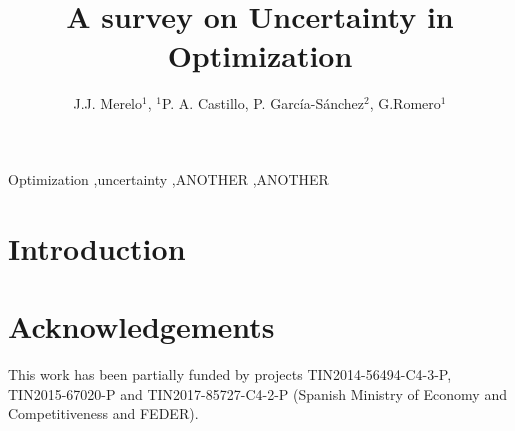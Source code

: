 \documentclass[preprint]{elsarticle}
\begin{document}
\begin{frontmatter}

\title{A survey on Uncertainty in Optimization}


\author{J.J. Merelo$^1$, $^1$P. A. Castillo, P. Garc\'ia-S\'anchez$^2$, G.Romero$^1$ } %
\address{
$^1$ Department of Computer Architecture and Computer Technology.\\ ETSIIT - CITIC. University of Granada, Spain\\
$^2$ Department of Computer Science and Engineering. ESI. University of C\'adiz, Spain\\

}


\begin{abstract}



\end{abstract}


\begin{keyword}
Optimization \sep uncertainty  \sep ANOTHER \sep ANOTHER
\end{keyword}

\end{frontmatter}





\section{Introduction}




\section*{Acknowledgements}
This work has been partially funded by projects TIN2014-56494-C4-3-P, TIN2015-67020-P and TIN2017-85727-C4-2-P (Spanish Ministry of Economy and Competitiveness and FEDER). %






\end{document}
